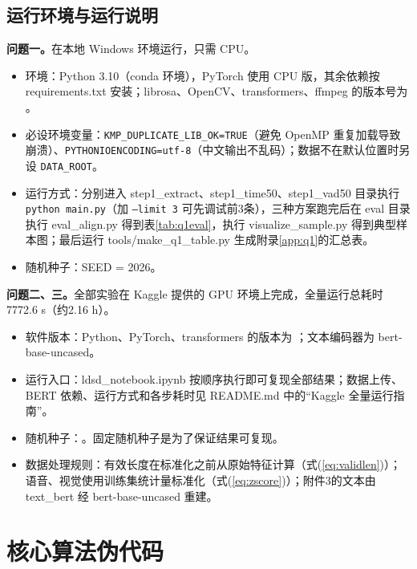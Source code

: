 \subsection{运行环境与运行说明}

\textbf{问题一。}在本地 Windows 环境运行，只需 CPU。
\begin{itemize}
\item 环境：Python 3.10（conda 环境），PyTorch 使用 CPU 版，其余依赖按 requirements.txt 安装；librosa、OpenCV、transformers、ffmpeg 的版本号为 。
\item 必设环境变量：\texttt{KMP\_DUPLICATE\_LIB\_OK=TRUE}（避免 OpenMP 重复加载导致崩溃）、\texttt{PYTHONIOENCODING=utf-8}（中文输出不乱码）；数据不在默认位置时另设 \texttt{DATA\_ROOT}。
\item 运行方式：分别进入 step1\_extract、step1\_time50、step1\_vad50 目录执行 \texttt{python main.py}（加 \texttt{--limit 3} 可先调试前3条），三种方案跑完后在 eval 目录执行 eval\_align.py 得到表\ref{tab:q1eval}，执行 visualize\_sample.py 得到典型样本图；最后运行 tools/make\_q1\_table.py 生成附录\ref{app:q1}的汇总表。
\item 随机种子：SEED = 2026。
\end{itemize}

\textbf{问题二、三。}全部实验在 Kaggle 提供的 GPU 环境上完成，全量运行总耗时 7772.6 s（约2.16 h）。
\begin{itemize}
\item 软件版本：Python、PyTorch、transformers 的版本为 ；文本编码器为 bert-base-uncased。
\item 运行入口：ldsd\_notebook.ipynb 按顺序执行即可复现全部结果；数据上传、BERT 依赖、运行方式和各步耗时见 README.md 中的“Kaggle 全量运行指南”。
\item 随机种子：。固定随机种子是为了保证结果可复现。
\item 数据处理规则：有效长度在标准化之前从原始特征计算（式(\ref{eq:validlen})）；语音、视觉使用训练集统计量标准化（式(\ref{eq:zscore})）；附件3的文本由 text\_bert 经 bert-base-uncased 重建。
\end{itemize}

\section{核心算法伪代码}\label{app:algo}

